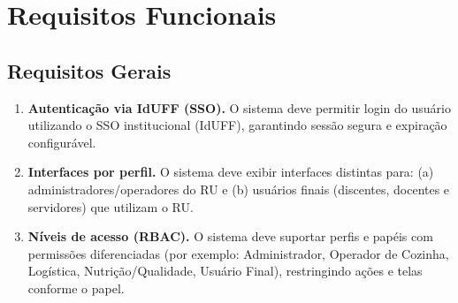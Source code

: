 \documentclass[12pt,a4paper]{article}
\begin{document}
\newpage
\section{Requisitos Funcionais}

\subsection{Requisitos Gerais}
\begin{enumerate}[label=\textbf{RF-GEN-\arabic*}, leftmargin=*, align=left]
    \item \textbf{Autenticação via IdUFF (SSO).} O sistema deve permitir login do usuário utilizando o SSO institucional (IdUFF), garantindo sessão segura e expiração configurável. %

    \item \textbf{Interfaces por perfil.} O sistema deve exibir interfaces distintas para: (a) administradores/operadores do RU e (b) usuários finais (discentes, docentes e servidores) que utilizam o RU. %

    \item \textbf{Níveis de acesso (RBAC).} O sistema deve suportar perfis e papéis com permissões diferenciadas (por exemplo: Administrador, Operador de Cozinha, Logística, Nutrição/Qualidade, Usuário Final), restringindo ações e telas conforme o papel. %

    
\end{enumerate}
\end{document}
